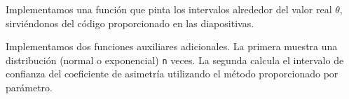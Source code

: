 \documentclass[a4paper]{article}
\begin{document}
Implementamos una función que pinta los intervalos alrededor del valor
real \(\theta\), sirviéndonos del código proporcionado en las
diapositivas.

\begin{Shaded}
	\begin{Highlighting}[]
		\StringTok{ }
		\StringTok{ }
		\StringTok{ }\StringTok{ }\NormalTok{intervals[,}\NormalTok{],}
		\StringTok{ }\NormalTok{intervals[,}\NormalTok{],}
		 \OperatorTok{:}
		
		\StringTok{ }\OperatorTok{+}
		\StringTok{    }\NormalTok{(}\NormalTok{(}\OperatorTok{+}
		\StringTok{    }\NormalTok{(} \NormalTok{(}\NormalTok{, }\NormalTok{)) }\OperatorTok{+}
		\StringTok{    }\NormalTok{(}\NormalTok{(} \NormalTok{) }\OperatorTok{+}
		\StringTok{    }\NormalTok{() }\OperatorTok{+}
		\StringTok{    }\NormalTok{(} \NormalTok{, } \NormalTok{,}
		 \NormalTok{(}\NormalTok{))}
		\NormalTok{\}}
	\end{Highlighting}
\end{Shaded}

Implementamos dos funciones auxiliares adicionales. La primera muestra
una distribución (normal o exponencial) \texttt{n} veces. La segunda
calcula el intervalo de confianza del coeficiente de asimetría
utilizando el método proporcionado por parámetro.
\end{document}
